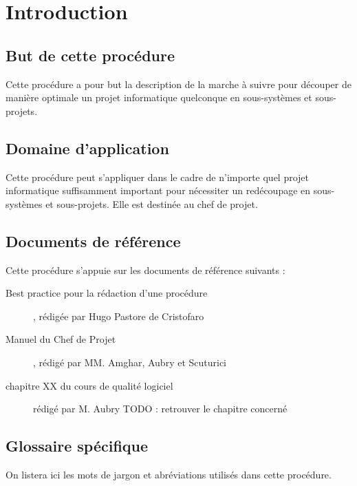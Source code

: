 \section{Introduction}

\subsection{But de cette procédure}

Cette procédure a pour but la description de la marche à suivre pour
découper de manière optimale un projet informatique quelconque en
sous-systèmes et sous-projets.


\subsection{Domaine d'application}

Cette procédure peut s'appliquer dans le cadre de n'importe quel projet
informatique suffisamment important pour nécessiter un redécoupage en
sous-systèmes et sous-projets. Elle est destinée au chef de projet.


\subsection{Documents de référence}

Cette procédure s'appuie sur les documents de référence suivants :

\begin{description}

\item[Best practice pour la rédaction d'une procédure], rédigée par Hugo
Pastore de Cristofaro
\item[Manuel du Chef de Projet], rédigé par MM. Amghar, Aubry et Scuturici 
\item[chapitre XX du cours de qualité logiciel] rédigé par M. Aubry TODO :
retrouver le chapitre concerné

\end{description}


\subsection{Glossaire spécifique}

On listera ici les mots de jargon et abréviations utilisés dans cette
procédure.

\vfill
\pagebreak
